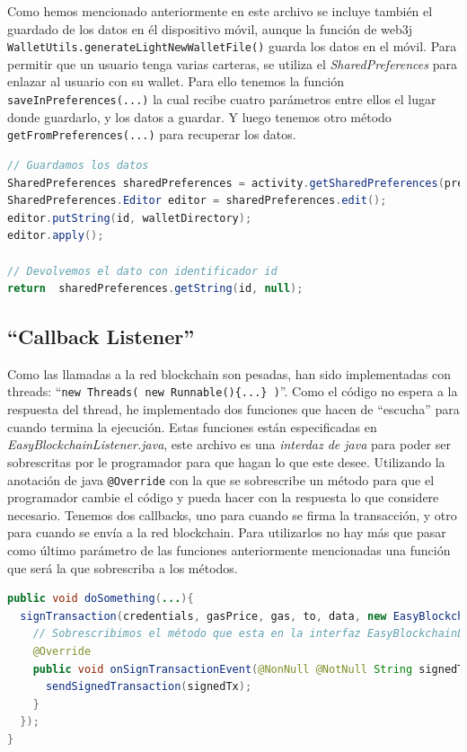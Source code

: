 Como hemos mencionado anteriormente en este archivo se incluye también el guardado de los datos en él dispositivo móvil, aunque la función de web3j \verb|WalletUtils.generateLightNewWalletFile()| guarda los datos en el móvil. Para permitir que un usuario tenga varias carteras, se utiliza el \emph{SharedPreferences} para enlazar al usuario con su wallet. Para ello tenemos la función \verb|saveInPreferences(...)| la cual recibe cuatro parámetros entre ellos el lugar donde guardarlo, y los datos a guardar. Y luego tenemos otro método \verb|getFromPreferences(...)| para recuperar los datos. 

\begin{lstlisting}[language=Java,float=ht,caption={[Java] Guardado y recuperación de dátos en SharedPreferences},label=lst:transactionHelper]
// Guardamos los datos
SharedPreferences sharedPreferences = activity.getSharedPreferences(prefsName, Context.MODE_PRIVATE);
SharedPreferences.Editor editor = sharedPreferences.edit();
editor.putString(id, walletDirectory);
editor.apply();

// Devolvemos el dato con identificador id
return  sharedPreferences.getString(id, null);
\end{lstlisting}

\subsection{``Callback Listener''}

Como las llamadas a la red blockchain son pesadas, han sido implementadas con threads: ``\verb|new Threads( new Runnable(){...} )|''. Como el código no espera a la respuesta del thread, he implementado dos funciones que hacen de ``escucha'' para cuando termina la ejecución. Estas funciones están especificadas en \emph{EasyBlockchainListener.java}, este archivo es una \emph{interdaz de java} para poder ser sobrescritas por le programador para que hagan lo que este desee. Utilizando la anotación de java \verb|@Override| con la que se sobrescribe un método para que el programador cambie el código y pueda hacer con la respuesta lo que considere necesario. Tenemos dos callbacks, uno para cuando se firma la transacción, y otro para cuando se envía a la red blockchain. Para utilizarlos no hay más que pasar como último parámetro de las funciones anteriormente mencionadas una función que será la que sobrescriba a los métodos.  

\begin{lstlisting}[language=Java,float=ht,caption={[Java] Ejemplo de sobrescritura de un listener.},label=lst:transactionHelper]
public void doSomething(...){
  signTransaction(credentials, gasPrice, gas, to, data, new EasyBlockchainListener() {
    // Sobrescribimos el método que esta en la interfaz EasyBlockchainListener
    @Override
    public void onSignTransactionEvent(@NonNull @NotNull String signedTx) {
      sendSignedTransaction(signedTx);
    }
  });
}
\end{lstlisting}

